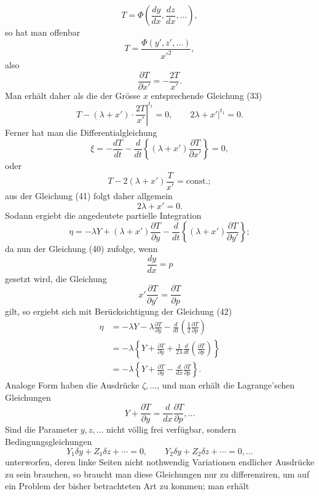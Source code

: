 \documentclass[11pt,a4paper,leqno]{article}
\begin{document}
\[
T=\Phi\left(\frac{dy}{dx},\frac{dz}{dx},\ldots\right),
\]
so hat man offenbar
\begin{equation}\tag{40}
T=\frac{\Phi(y',z',\ldots)}{x'^2},
\end{equation}
also
\[
\frac{\partial T}{\partial x'}=-\frac{2T}{x'}.
\]
Man erhält daher als die der Grösse $x$ entsprechende Gleichung (33)
\begin{equation}\tag{41}
\left.T-(\lambda+x')\cdot\frac{2T}{x'}\right|^{t_1}=0,\qquad
\left.2\lambda+x'\right|^{t_1}=0.
\end{equation}
Ferner hat man die Differentialgleichung
\[
\xi=-\frac{dT}{dt}-\frac{d}{dt}\left\{(\lambda+x')\frac{\partial T}{\partial x'}\right\}=0,
\]
oder
\[
T-2(\lambda+x')\frac{T}{x'}=\mathrm{const.};
\]
aus der Gleichung (41) folgt daher allgemein
\begin{equation}\tag{42}
2\lambda+x'=0.
\end{equation}
Sodann ergiebt die angedeutete partielle Integration
\[
\eta=-\lambda Y+(\lambda+x')\frac{\partial T}{\partial y}
-\frac{d}{dt}\left\{(\lambda+x')\frac{\partial T}{\partial y'}\right\};
\]
da nun der Gleichung (40) zufolge, wenn
\[
\frac{dy}{dx}=p
\]
gesetzt wird, die Gleichung
\[
x'\frac{\partial T}{\partial y'}=\frac{\partial T}{\partial p}
\]
gilt, so ergiebt sich mit Berücksichtigung der Gleichung (42)
\[
\begin{aligned}
\eta&=-\lambda Y-\lambda\frac{\partial T}{\partial y}
-\frac{d}{dt}\left(\frac12\frac{\partial T}{\partial p}\right)\\
&=-\lambda\left\{Y+\frac{\partial T}{\partial y}
+\frac{1}{2\lambda}\frac{d}{dt}\left(\frac{\partial T}{\partial p}\right)\right\}\\
&=-\lambda\left\{Y+\frac{\partial T}{\partial y}
-\frac{d}{dx}\frac{\partial T}{\partial p}\right\}.
\end{aligned}
\]
Analoge Form haben die Ausdrücke $\zeta,\ldots$, und man erhält die Lagrange'schen Gleichungen
\begin{equation}\tag{43}
Y+\frac{\partial T}{\partial y}=\frac{d}{dx}\frac{\partial T}{\partial p},\ldots
\end{equation}
Sind die Parameter $y,z,\ldots$ nicht völlig frei verfügbar, sondern Bedingungsgleichungen
\[
Y_1\delta y+Z_1\delta z+\cdots=0,\qquad
Y_2\delta y+Z_2\delta z+\cdots=0,\ldots
\]
unterworfen, deren linke Seiten nicht nothwendig Variationen endlicher Ausdrücke zu sein brauchen, so braucht man diese Gleichungen nur zu differenziren, um auf ein Problem der bisher betrachteten Art zu kommen; man erhält
\end{document}
